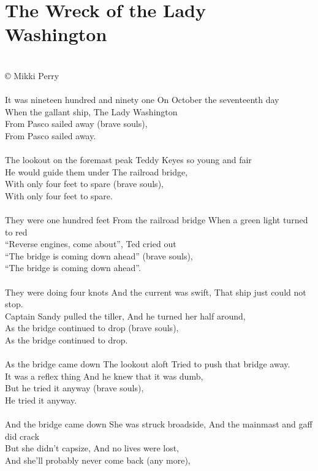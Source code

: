 \documentclass[letterpaper,9pt]{article}
\begin{document}
\section{The Wreck of the Lady Washington}
\large
\noindent
\\© Mikki Perry
\\
\\It was nineteen hundred and ninety one On October the seventeenth day
\\When the gallant ship, The Lady Washington
\\From Pasco sailed away (brave souls),
\\From Pasco sailed away.
\\
\\The lookout on the foremast peak Teddy Keyes so young and fair
\\He would guide them under The railroad bridge,
\\With only four feet to spare (brave souls),
\\With only four feet to spare.
\\
\\They were one hundred feet From the railroad bridge When a green light turned to red
\\“Reverse engines, come about”, Ted cried out
\\“The bridge is coming down ahead” (brave souls),
\\“The bridge is coming down ahead”.
\\
\\They were doing four knots And the current was swift, That ship just could not stop. 
\\Captain Sandy pulled the tiller, And he turned her half around,
\\As the bridge continued to drop (brave souls),
\\As the bridge continued to drop.
\\
\\As the bridge came down The lookout aloft Tried to push that bridge away.
\\It was a reflex thing And he knew that it was dumb,
\\But he tried it anyway (brave souls),
\\He tried it anyway.
\\
\\And the bridge came down She was struck broadside, And the mainmast and gaff did crack
\\But she didn't capsize, And no lives were lost,
\\And she'll probably never come back (any more),
\end{document}
